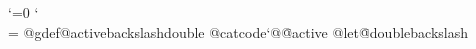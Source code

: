 %
\def\openindices{%
  \newindex{cp}%
  \newcodeindex{fn}%
  \newcodeindex{vr}%
  \newcodeindex{tp}%
  \newcodeindex{ky}%
  \newcodeindex{pg}%
}

\outer\def\bye{\pagealignmacro\tracingstats=1\ptexend}


\newcount\tempnum
\newcount\lnkcount
\newtoks\filename
\newcount\filenamelength
\newcount\pgn
\newtoks\toksA
\newtoks\toksB
\newtoks\toksC
\newtoks\toksD
\newbox\boxA
\newcount\countA
\newif\ifpdf
\newif\ifpdfmakepagedest

\ifx\pdfoutput\undefined
\else
  \ifx\pdfoutput\relax
  \else
    \ifcase\pdfoutput
    \else
      \pdftrue
    \fi
  \fi
\fi


%
{\catcode`\@=0 \catcode`\\=\active
 @gdef@activebackslashdouble{%
   @catcode`@\=@active
   @let\=@doublebackslash}
}

%
%
\def\HyPsdSubst#1#2#3{%
  \def\HyPsdReplace##1#1##2\END{%
    ##1%
    \ifx\\##2\\%
    \else
      #2%
      \HyReturnAfterFi{%
        \HyPsdReplace##2\END
      }%
    \fi
  }%
  \xdef#3{\expandafter\HyPsdReplace#3#1\END}%
}
\long{}

\def\backslashparens#1{%
  \xdef#1{#1}%
  \HyPsdSubst{(}{\realbackslash(}{#1}%
  \HyPsdSubst{)}{\realbackslash)}{#1}%
}

